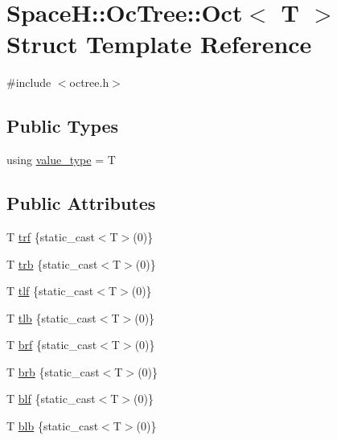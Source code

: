 \hypertarget{struct_space_h_1_1_oc_tree_1_1_oct}{}\section{SpaceH\+:\+:Oc\+Tree\+:\+:Oct$<$ T $>$ Struct Template Reference}
\label{struct_space_h_1_1_oc_tree_1_1_oct}


{\ttfamily \#include $<$octree.\+h$>$}

\subsection*{Public Types}
\begin{DoxyCompactItemize}
\item 
using \mbox{\hyperlink{struct_space_h_1_1_oc_tree_1_1_oct_a41cf6a021264a323ca727e1a261202d7}{value\+\_\+type}} = T
\end{DoxyCompactItemize}
\subsection*{Public Attributes}
\begin{DoxyCompactItemize}
\item 
T \mbox{\hyperlink{struct_space_h_1_1_oc_tree_1_1_oct_a5216deb04bc777d394bc21c0dfa3215a}{trf}} \{static\+\_\+cast$<$T$>$(0)\}
\item 
T \mbox{\hyperlink{struct_space_h_1_1_oc_tree_1_1_oct_a75d776212702a914b6238b7bc2c3aacc}{trb}} \{static\+\_\+cast$<$T$>$(0)\}
\item 
T \mbox{\hyperlink{struct_space_h_1_1_oc_tree_1_1_oct_adc23e3c0b2a50049bd7b176a1abc64d4}{tlf}} \{static\+\_\+cast$<$T$>$(0)\}
\item 
T \mbox{\hyperlink{struct_space_h_1_1_oc_tree_1_1_oct_abf983128e53b8347e40062b196ce10e0}{tlb}} \{static\+\_\+cast$<$T$>$(0)\}
\item 
T \mbox{\hyperlink{struct_space_h_1_1_oc_tree_1_1_oct_af6388b3ca622c2a2309a97d6dbef9f29}{brf}} \{static\+\_\+cast$<$T$>$(0)\}
\item 
T \mbox{\hyperlink{struct_space_h_1_1_oc_tree_1_1_oct_a8d4bf5ed19244049c060746f92c4565f}{brb}} \{static\+\_\+cast$<$T$>$(0)\}
\item 
T \mbox{\hyperlink{struct_space_h_1_1_oc_tree_1_1_oct_a2b98879ab115598ed5e31dbad59de76a}{blf}} \{static\+\_\+cast$<$T$>$(0)\}
\item 
T \mbox{\hyperlink{struct_space_h_1_1_oc_tree_1_1_oct_a5686b8a8af2a730540161b5df01e9fd8}{blb}} \{static\+\_\+cast$<$T$>$(0)\}
\end{DoxyCompactItemize}


